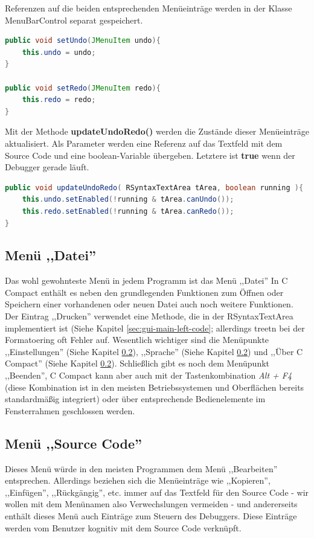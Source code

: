Referenzen auf die beiden entsprechenden Menüeinträge werden in der Klasse MenuBarControl separat gespeichert.
\begin{lstlisting}[language=JAVA]
public void setUndo(JMenuItem undo){
	this.undo = undo;
}

public void setRedo(JMenuItem redo){
	this.redo = redo;
}
\end{lstlisting}

Mit der Methode \textbf{updateUndoRedo()} werden die Zustände dieser Menüeinträge aktualisiert. Als Parameter werden eine Referenz auf das Textfeld mit dem Source Code und eine boolean-Variable übergeben. Letztere ist \textbf{true} wenn der Debugger gerade läuft.
\begin{lstlisting}[language=JAVA]
public void updateUndoRedo( RSyntaxTextArea tArea, boolean running ){
	this.undo.setEnabled(!running & tArea.canUndo());
	this.redo.setEnabled(!running & tArea.canRedo());
}
\end{lstlisting}

\subsection{Menü ,,Datei''}
Das wohl gewohnteste Menü in jedem Programm ist das Menü ,,Datei'' In C Compact enthält es neben den grundlegenden Funktionen zum Öffnen oder Speichern einer vorhandenen oder neuen Datei auch noch weitere Funktionen. Der Eintrag ,,Drucken'' verwendet eine Methode, die in der RSyntaxTextArea implementiert ist (Siehe Kapitel \ref{sec:gui-main-left-code}; allerdings treetn bei der Formatoering oft Fehler auf. Wesentlich wichtiger sind die Menüpunkte ,,Einstellungen'' (Siehe Kapitel \ref{}), ,,Sprache'' (Siehe Kapitel \ref{}) und ,,Über C Compact'' (Siehe Kapitel \ref{}). Schließlich gibt es noch dem Menüpunkt ,,Beenden'', C Compact kann aber auch mit der Tastenkombination \emph{Alt + F4} (diese Kombination ist in den meisten Betriebssystemen und Oberflächen bereits standardmäßig integriert) oder über entsprechende Bedienelemente im Fensterrahmen geschlossen werden.

\subsection{Menü ,,Source Code''}
Dieses Menü würde in den meisten Programmen dem Menü ,,Bearbeiten'' entsprechen. Allerdings beziehen sich die Menüeinträge wie ,,Kopieren'', ,,Einfügen'', ,,Rückgängig'', etc. immer auf das Textfeld für den Source Code - wir wollen mit dem Menünamen also Verwechslungen vermeiden - und andererseits enthält dieses Menü auch Einträge zum Steuern des Debuggers. Diese Einträge werden vom Benutzer kognitiv mit dem Source Code verknüpft.

